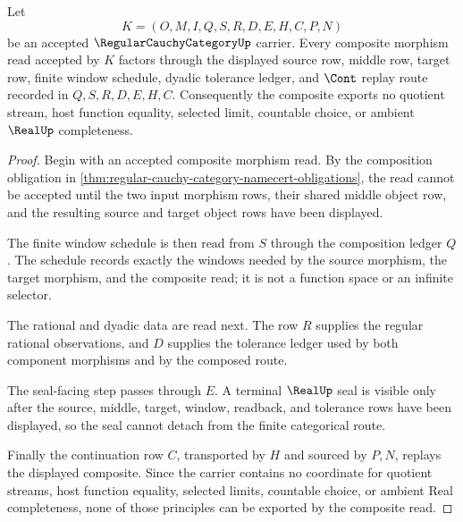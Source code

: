 \begin{theorem}
\label{thm:regular-cauchy-category-composition-route}
Let
$$
K=(O,M,I,Q,S,R,D,E,H,C,P,N)
$$
be an accepted $\RegularCauchyCategoryUp$ carrier. Every composite morphism read accepted by $K$ factors through the displayed source row, middle row, target row, finite window schedule, dyadic tolerance ledger, and $\Cont$ replay route recorded in $Q,S,R,D,E,H,C$. Consequently the composite exports no quotient stream, host function equality, selected limit, countable choice, or ambient $\RealUp$ completeness.
\end{theorem}
\begin{proof}
Begin with an accepted composite morphism read. By the composition obligation in \autoref{thm:regular-cauchy-category-namecert-obligations}, the read cannot be accepted until the two input morphism rows, their shared middle object row, and the resulting source and target object rows have been displayed.

The finite window schedule is then read from $S$ through the composition ledger $Q$. The schedule records exactly the windows needed by the source morphism, the target morphism, and the composite read; it is not a function space or an infinite selector.

The rational and dyadic data are read next. The row $R$ supplies the regular rational observations, and $D$ supplies the tolerance ledger used by both component morphisms and by the composed route.

The seal-facing step passes through $E$. A terminal $\RealUp$ seal is visible only after the source, middle, target, window, readback, and tolerance rows have been displayed, so the seal cannot detach from the finite categorical route.

Finally the continuation row $C$, transported by $H$ and sourced by $P,N$, replays the displayed composite. Since the carrier contains no coordinate for quotient streams, host function equality, selected limits, countable choice, or ambient Real completeness, none of those principles can be exported by the composite read.
\end{proof}


